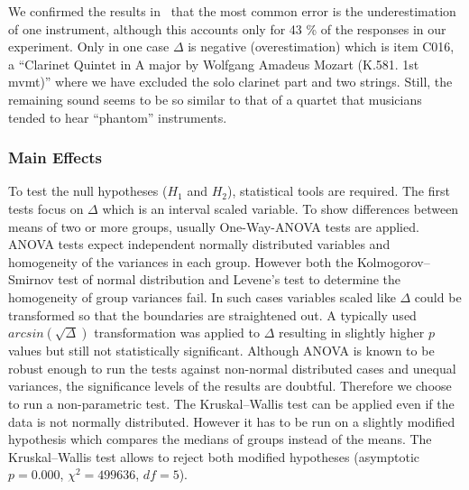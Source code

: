 We confirmed the results in~\cite{huron89} that the most common error is the underestimation of one instrument, although this accounts only for 43 \% of the responses in our experiment. Only in one case $\Delta$ is negative (overestimation) which is item C016, a ``Clarinet Quintet in A major by Wolfgang Amadeus Mozart (K.581. 1st mvmt)'' where we have excluded the solo clarinet part and two strings. Still, the remaining sound seems to be so similar to that of a quartet that musicians tended to hear ``phantom'' instruments.

\subsubsection*{Main Effects}

To test the null hypotheses ($H_1$ and $H_2$), statistical tools are required.
The first tests focus on $\Delta$ which is an interval scaled variable. To show differences between means of two or more groups, usually One-Way-ANOVA tests are applied. ANOVA tests expect independent normally distributed variables and homogeneity of the variances in each group. However both the Kolmogorov--Smirnov test of normal distribution and Levene's test to determine the homogeneity of group variances fail. In such cases variables scaled like $\Delta$ could be transformed so that the boundaries are straightened out. A typically used $arcsin(\sqrt{\Delta})$ transformation was applied to $\Delta$ resulting in slightly higher $p$ values but still not statistically significant. Although ANOVA is known to be robust enough to run the tests against non-normal distributed cases and unequal variances, the significance levels of the results are doubtful. Therefore we choose to run a non-parametric test. The Kruskal--Wallis test can be applied even if the data is not normally distributed. However it has to be run on a slightly modified hypothesis which compares the medians of groups instead of the means. The Kruskal--Wallis test allows to reject both modified hypotheses (asymptotic $p = 0.000$, $\chi^2 = 499636$, $df=5$). 

